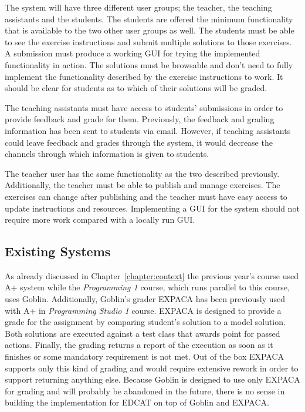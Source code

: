 The system will have three different user groups; the teacher, the teaching assistants and the students. The students are offered the minimum functionality that is available to the two other user groups as well. The students must be able to see the exercise instructions and submit multiple solutions to those exercises. A submission must produce a working GUI for trying the implemented functionality in action. The solutions must be browsable and don't need to fully implement the functionality described by the exercise instructions to work. It should be clear for students as to which of their solutions will be graded.

The teaching assistants must have access to students' submissions in order to provide feedback and grade for them. Previously, the feedback and grading information has been sent to students via email. However, if teaching assistants could leave feedback and grades through the system, it would decrease the channels through which information is given to students.

The teacher user has the same functionality as the two described previously. Additionally, the teacher must be able to publish and manage exercises. The exercises can change after publishing and the teacher must have easy access to update instructions and resources. Implementing a GUI for the system should not require more work compared with a locally run GUI.


\subsection{Existing Systems}
\label{subsection:existingSystems}

As already discussed in Chapter~\ref{chapter:context} the previous year's course used A+ system while the \emph{Programming 1} course, which runs parallel to this course, uses Goblin. Additionally, Goblin's grader EXPACA has been previously used with A+ in \emph{Programming Studio 1} course. EXPACA is designed to provide a grade for the assignment by comparing student's solution to a model solution. Both solutions are executed against a test class that awards point for passed actions. Finally, the grading returns a report of the execution as soon as it finishes or some mandatory requirement is not met. Out of the box EXPACA supports only this kind of grading and would require extensive rework in order to support returning anything else. Because Goblin is designed to use only EXPACA for grading and will probably be abandoned in the future, there is no sense in building the implementation for EDCAT on top of Goblin and EXPACA.

